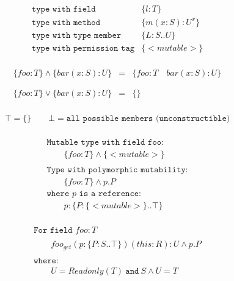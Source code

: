 \begin{equation*}
\begin{array}{ll}
\texttt{type with field} & \{ l: T \} \\
\texttt{type with method} & \{ m(x: S): U^x \} \\
\texttt{type with type member} & \{ L: S..U \} \\
\texttt{type with permission tag} & \{ <mutable> \} \\
\end{array}
\end{equation*}


\begin{equation*}
\begin{array}{rcl}
\{foo:T\} \land \{bar(x:S):U\} &
=&
\{foo:T \quad bar(x:S):U\} \\
 \\
 \\
\{foo:T\} \lor \{bar(x:S):U\} &
=&
\{\} \\
\end{array}
\end{equation*}


\begin{equation*}
\begin{array}{c}
\top = \{\} \qquad
\bot = \texttt{all possible members (unconstructible)} \\
\end{array}
\end{equation*}


\begin{equation*}
\begin{array}{l}
\texttt{Mutable type with field foo:}\\
\qquad \{foo:T\} \land \{<mutable>\}\\
\\
\texttt{Type with polymorphic mutability:}\\
\qquad \{foo:T\} \land p.P\\
 \texttt{where $p$ is a reference:}\ \\
\qquad p: \{ P: \{<mutable>\}..\top \}\\
\end{array}
\end{equation*}


\begin{equation*}
\begin{array}{l}
\texttt{For field } foo: T \\
\\
\qquad foo_{get}(p:\{ P: S..\top \})(this: R): U \land p.P \\
\\
\texttt{where:} \\
\qquad U = Readonly(T)\ \texttt{and}\ S \land U = T \\
\end{array}
\end{equation*}


